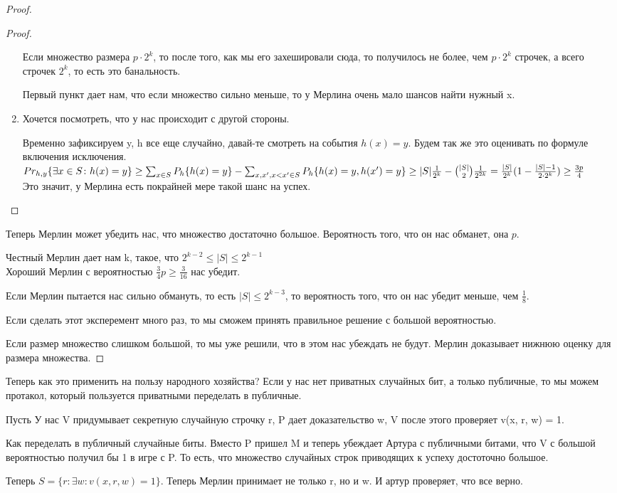 \begin{proof}
\begin{proof}
\begin{enumerate}
		Если множество размера $p\cdot 2^k$, то после того, как мы его захешировали сюда, то получилось
		не более, чем  $p\cdot 2^k$ строчек, а всего строчек $2^k$, то есть это банальность.  
		
		Первый пункт дает нам, что если множество сильно меньше, то у Мерлина очень мало шансов найти нужный x.
		\item 
	 	Хочется посмотреть, что у нас происходит с другой стороны.  	
	 	
	 	Временно зафиксируем y, h все еще случайно, давай-те смотреть на события $h(x) = y$.
	 	Будем так же это оценивать по формуле включения исключения. 
	 	$Pr_{h,y}\{\exists x \in S \colon h(x) = y\} \ge 
	 	\sum_{x \in S} P_h\{h(x) = y\} - \sum_{x, x', x < x' \in S} P_h\{h(x) = y, h(x') = y\} \\
	 	\ge |S|\frac{1}{2^k} - \binom{|S|}{2}\frac{1}{2^{2k}} = \frac{|S|}{2^k}(1 - \frac{|S| - 1}{2 \cdot 2^{k}}) \ge \frac{3p}{4}$ \\
		
		Это значит, у Мерлина есть покрайней мере такой шанс на успех.
		\end{enumerate}
	\end{proof}

	Теперь Мерлин может убедить нас, что множество достаточно большое. Вероятность того, что он нас обманет, она $p$.

	Честный Мерлин дает нам k, такое, что $2^{k - 2} \le |S| \le 2^{k - 1}$ \\
	Хороший Мерлин с вероятностью $\frac{3}{4}p \ge \frac{3}{16}$ нас убедит.

	Если Мерлин пытается нас сильно обмануть, то есть $|S| \le 2^{k - 3}$, то 
	вероятность того, что он нас убедит меньше, чем $\frac{1}{8}$.

	Если сделать этот эксперемент много раз, то мы сможем принять правильное решение с большой вероятностью.

        Если размер множество слишком большой, то мы уже решили, что в этом нас убеждать не будут. Мерлин доказывает нижнюю оценку для
        размера множества. 
\end{proof}

Теперь как это применить на пользу народного хозяйства? Если у нас нет приватных случайных бит, а только 
публичные, то мы можем протакол, который пользуется приватными переделать в публичные.

Пусть У нас V придумывает секретную случайную строчку r, P дает доказательство w, V после этого проверяет v(x, r, w) = 1.

Как переделать в публичный случайные биты. Вместо P пришел M и теперь убеждает Артура с публичными битами, что V с большой вероятностью
получил бы 1 в игре с P. То есть, что множество случайных строк приводящих к успеху достоточно большое.

Теперь $S = \{r \colon \exists w \colon v(x, r, w) = 1\}$. Теперь Мерлин принимает не только r, но и w. И артур проверяет, что все верно. 

 
